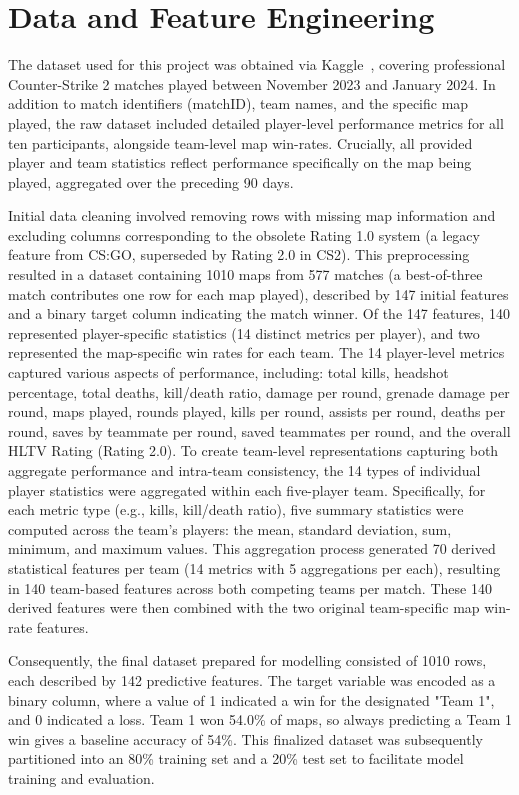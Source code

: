 \documentclass[11pt]{article}
\begin{document}
\section{Data and Feature Engineering}
The dataset used for this project was obtained via Kaggle~\cite{picinin2024hltv}, covering professional Counter-Strike 2 matches played between November 2023 and January 2024. In addition to match identifiers (matchID), team names, and the specific map played, the raw dataset included detailed player-level performance metrics for all ten participants, alongside team-level map win-rates. Crucially, all provided player and team statistics reflect performance specifically on the map being played, aggregated over the preceding 90 days.

Initial data cleaning involved removing rows with missing map information and excluding columns corresponding to the obsolete Rating 1.0 system (a legacy feature from CS:GO, superseded by Rating 2.0 in CS2). This preprocessing resulted in a dataset containing 1010 maps from 577 matches (a best-of-three match contributes one row for each map played), described by 147 initial features and a binary target column indicating the match winner. Of the 147 features, 140 represented player-specific statistics (14 distinct metrics per player), and two represented the map-specific win rates for each team. The 14 player-level metrics captured various aspects of performance, including: total kills, headshot percentage, total deaths, kill/death ratio, damage per round, grenade damage per round, maps played, rounds played, kills per round, assists per round, deaths per round, saves by teammate per round, saved teammates per round, and the overall HLTV Rating (Rating 2.0).
To create team-level representations capturing both aggregate performance and intra-team consistency, the 14 types of individual player statistics were aggregated within each five-player team. Specifically, for each metric type (e.g., kills, kill/death ratio), five summary statistics were computed across the team's players: the mean, standard deviation, sum, minimum, and maximum values. This aggregation process generated 70 derived statistical features per team (14 metrics with 5 aggregations per each), resulting in 140 team-based features across both competing teams per match. These 140 derived features were then combined with the two original team-specific map win-rate features.

Consequently, the final dataset prepared for modelling consisted of 1010 rows, each described by 142 predictive features. The target variable was encoded as a binary column, where a value of 1 indicated a win for the designated "Team 1", and 0 indicated a loss. Team 1 won 54.0\% of maps, so always predicting a Team 1 win gives a baseline accuracy of 54\%. This finalized dataset was subsequently partitioned into an 80\% training set and a 20\% test set to facilitate model training and evaluation.
\end{document}
